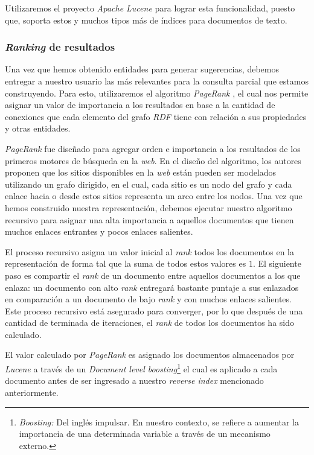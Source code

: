 Utilizaremos el proyecto \textit{Apache Lucene} \cite{apache2012welcome} para
lograr esta funcionalidad, puesto que, soporta estos y muchos tipos más de
índices para documentos de texto.

\subsubsection{\textit{Ranking} de resultados}

Una vez que hemos obtenido entidades para generar sugerencias, debemos entregar
a nuestro usuario las más relevantes para la consulta parcial que estamos
construyendo. Para esto, utilizaremos el algoritmo \textit{PageRank}
\cite{page1999pagerank}, el cual nos permite asignar un valor de importancia a
los resultados en base a la cantidad de conexiones que cada elemento del grafo
\textit{RDF} tiene con relación a sus propiedades y otras entidades.

\textit{PageRank} fue diseñado para agregar orden e importancia a los resultados
de los primeros motores de búsqueda en la \textit{web}. En el diseño del
algoritmo, los autores proponen que los sitios disponibles en la \textit{web}
están pueden ser modelados utilizando un grafo dirigido, en el cual, cada sitio
es un nodo del grafo y cada enlace hacia o desde estos sitios representa un arco
entre los nodos. Una vez que hemos construido nuestra representación, debemos
ejecutar nuestro algoritmo recursivo para asignar una alta importancia a
aquellos documentos que tienen muchos enlaces entrantes y pocos enlaces
salientes.

El proceso recursivo asigna un valor inicial al \textit{rank} todos los
documentos en la representación de forma tal que la suma de todos estos valores
es $1$. El siguiente paso es compartir el \textit{rank} de un documento entre
aquellos documentos a los que enlaza: un documento con alto \textit{rank}
entregará bastante puntaje a sus enlazados en comparación a un documento de bajo
\textit{rank} y con muchos enlaces salientes. Este proceso recursivo está
asegurado para converger, por lo que después de una cantidad de terminada de
iteraciones, el \textit{rank} de todos los documentos ha sido calculado.

El valor calculado por \textit{PageRank} es asignado los documentos almacenados
por \textit{Lucene} a través de un \textit{Document level
boosting}\footnote{\textit{Boosting:} Del inglés impulsar. En nuestro contexto,
se refiere a aumentar la importancia de una determinada variable a través de un
mecanismo externo.} el cual es aplicado a cada documento antes de ser ingresado
a nuestro \textit{reverse index} mencionado anteriormente.

% 
% 
% 
